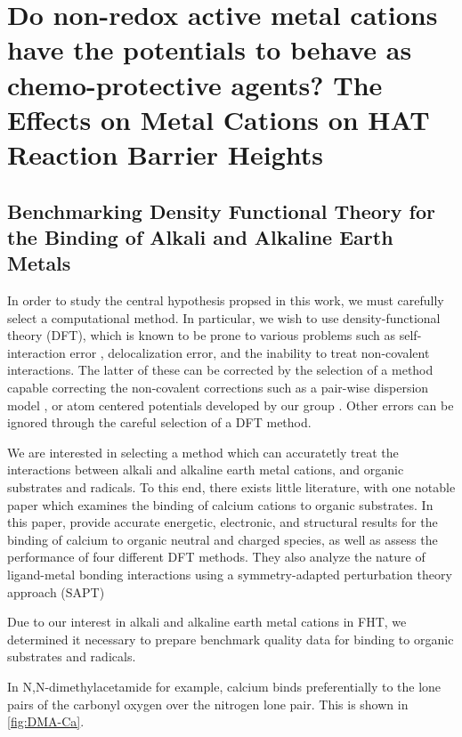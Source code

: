 \chapter{Do non-redox active metal cations have the potentials to behave as
  chemo-protective agents? The Effects on Metal Cations on HAT Reaction Barrier
  Heights}
\label{ch:hat}

\section{Benchmarking Density Functional Theory for the Binding of
  Alkali and Alkaline Earth Metals}

In order to study the central hypothesis propsed in this work, we must carefully
select a computational method. In particular, we wish to use density-functional
theory (DFT), which is known to be prone to various problems such as
self-interaction error \cite{Dutoi2006}, delocalization
error,\cite{Otero-de-la-Roza2014} and the inability to treat non-covalent
interactions.\cite{Johnson2009,DiLabio2016} The latter of these can be corrected
by the selection of a method capable correcting the non-covalent corrections
such as a pair-wise dispersion model , or atom
centered potentials developed by our group
. Other errors can be ignored through the
careful selection of a DFT method.

We are interested in selecting a method which can accuratetly treat
the interactions between alkali and alkaline earth metal cations, and
organic substrates and radicals. To this end, there exists little
literature, with one notable paper\cite{Suarez2011} which examines the
binding of calcium cations to organic substrates. In this paper,
\citet{Suarez2011} provide accurate energetic, electronic, and
structural results for the binding of calcium to organic neutral and
charged species, as well as assess the performance of four different
DFT methods. They also analyze the nature of ligand-metal bonding
interactions using a symmetry-adapted perturbation theory approach
(SAPT)  

Due to our interest in alkali and alkaline earth metal cations in FHT,
we determined it necessary to prepare benchmark quality data for
binding to organic substrates and radicals.

 In N,N-dimethylacetamide for example, calcium
  binds preferentially to the lone pairs of the carbonyl oxygen over
  the nitrogen lone pair. This is shown in \ref{fig:DMA-Ca}.

